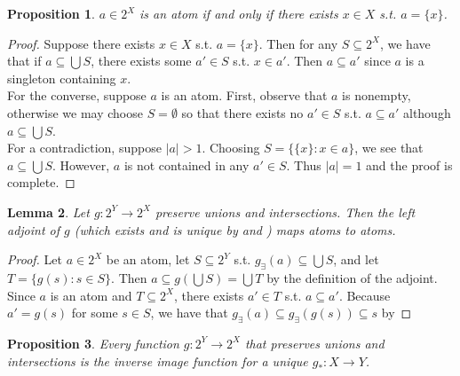 \documentclass{article}
\newtheorem{proposition}{Proposition}[section]
\newtheorem{lemma}[proposition]{Lemma}
\begin{document}
\begin{proposition}\label{prop:powset-atoms-are-singletons}
$a \in 2^X$ is an atom if and only if there exists $x \in X$ s.t. $a = \{x\}$.
\end{proposition}

\begin{proof}
Suppose there exists $x \in X$ s.t. $a = \{x\}$. Then for any $S \subseteq 2^X$, we have that if $a \subseteq \bigcup S$, there exists some $a' \in S$ s.t. $x \in a'$. Then $a \subseteq a'$ since $a$ is a singleton containing $x$. \\ 

For the converse, suppose $a$ is an atom. First, observe that $a$ is nonempty, otherwise we may choose $S = \emptyset$ so that there exists no $a' \in S$ s.t. $a \subseteq a'$ although $a \subseteq \bigcup S$. \\

For a contradiction, suppose $|a| > 1$. Choosing $S = \{\{x\} : x \in a\}$, we see that $a \subseteq \bigcup S$. However, $a$ is not contained in any $a' \in S$. Thus $|a| = 1$ and the proof is complete.
\end{proof}

\begin{lemma}\label{lem:left-adjoint-maps-atoms-to-atoms}
Let $g : 2^Y \to 2^X$ preserve unions and intersections. Then the left adjoint of $g$ (which exists and is unique by  and ) maps atoms to atoms. 
\end{lemma}

\begin{proof}
Let $a \in 2^X$ be an atom, let $S \subseteq 2^Y$ s.t. $g_\exists(a) \subseteq \bigcup S$, and let $T = \{g(s) : s \in S\}$. Then $a \subseteq g(\bigcup S) = \bigcup T$ by the definition of the adjoint. Since $a$ is an atom and $T \subseteq 2^X$, there exists $a' \in T$ s.t. $a \subseteq a'$. Because $a' = g(s)$ for some $s \in S$, we have that $g_\exists(a) \subseteq g_\exists(g(s)) \subseteq s$ by 
\end{proof}

\begin{proposition} \label{prop:powset-morphism-is-inv-image}
Every function $g : 2^Y \to 2^X$ that preserves unions and intersections is the inverse image function for a unique $g_* : X \to Y$. 
\end{proposition}
\end{document}
